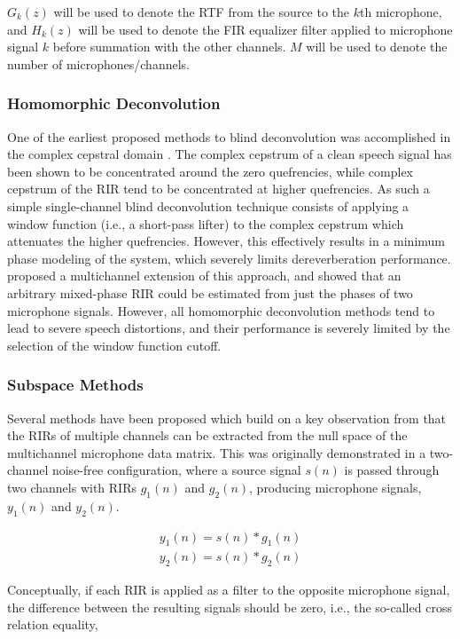 $G_k(z)$ will be used to denote the RTF from the source to the $k$th microphone, and $H_k(z)$ will be used to denote the FIR equalizer filter applied to microphone signal $k$ before summation with the other channels. $M$ will be used to denote the number of microphones/channels.


\subsubsection{Homomorphic Deconvolution}

One of the earliest proposed methods to blind deconvolution was accomplished in the complex cepstral domain \citep{oppenheim1976digital}. The complex cepstrum of a clean speech signal has been shown to be concentrated around the zero quefrencies, while complex cepstrum of the RIR tend to be concentrated at higher quefrencies. As such a simple single-channel blind deconvolution technique consists of applying a window function (i.e., a short-pass lifter) to the complex cepstrum which attenuates the higher quefrencies. However, this effectively results in a minimum phase modeling of the system, which severely limits dereverberation performance. \cite{petropulu1994cepstrum} proposed a multichannel extension of this approach, and showed that an arbitrary mixed-phase RIR could be estimated from just the phases of two microphone signals. However, all homomorphic deconvolution methods tend to lead to severe speech distortions, and their performance is severely limited by the selection of the window function cutoff. 


\subsubsection{Subspace Methods}

Several methods have been proposed which build on a key observation from \cite{gurelli1995evam} that the RIRs of multiple channels can be extracted from the null space of the multichannel microphone data matrix. This was originally demonstrated in a two-channel noise-free configuration, where a source signal $s(n)$ is passed through two channels with RIRs $g_1(n)$ and $g_2(n)$, producing microphone signals,$y_1(n)$ and $y_2(n)$.

\noindent
\begin{eqnarray}
	y_1(n) = s(n)*g_1(n) \\
	y_2(n) = s(n)*g_2(n)
\end{eqnarray}

Conceptually, if each RIR is applied as a filter to the opposite microphone signal, the difference between the resulting signals should be zero, i.e., the so-called cross relation equality,

